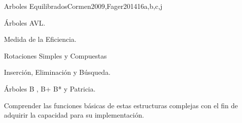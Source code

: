 \begin{syllabus}
\begin{unit}{Arboles Equilibrados}{}{Cormen2009,Fager2014}{16}{a,b,c,j}
   \begin{topics}
        \item Árboles AVL.
	\item Medida de la Eficiencia.
	\item Rotaciones Simples y Compuestas
	\item Inserción, Eliminación y Búsqueda.
	\item Árboles B , B+ B* y Patricia.
   \end{topics}

   \begin{learningoutcomes}
      \item Comprender las funciones básicas de estas estructuras complejas con el fin de adquirir la capacidad para su implementación.
   \end{learningoutcomes}
\end{unit}

\begin{coursebibliography}
\end{coursebibliography}

\end{syllabus}

